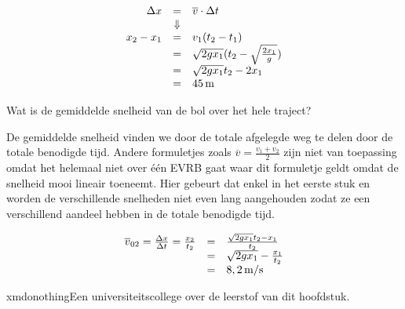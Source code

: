 \documentclass{ximera}
\begin{document}
\begin{exercise}
\begin{question}
\begin{oplossing}
	\[
	\begin{array}{rcl}
	\Delta x&=&\overline{v}\cdot\Delta t\\
	&\Downarrow&\\
	x_2-x_1&=&v_1(t_2-t_1)\\
	&=&\sqrt{2gx_1}(t_2-\sqrt{\frac{2x_1}{g}})\\
	&=&\sqrt{2gx_1}t_2-2x_1\\
	&=&45\rm\,m
	\end{array}
	\]

\end{oplossing}
\end{question}
\begin{question} Wat is de gemiddelde snelheid van de bol over het hele traject? \end{question}

\begin{oplossing}


De gemiddelde snelheid vinden we door de totale afgelegde weg te delen door de totale benodigde tijd. Andere formuletjes zoals $\overline{v}=\frac{v_1+v_2}{2}$ zijn niet van toepassing omdat het helemaal niet over \'e\'en EVRB gaat waar dit formuletje geldt omdat de snelheid mooi lineair toeneemt. Hier gebeurt dat enkel in het eerste stuk en worden de verschillende snelheden niet even lang aangehouden zodat ze een verschillend aandeel hebben in de totale benodigde tijd.

\[
\begin{array}{rcl}
\overline{v}_{02}=\frac{\Delta x}{\Delta t}=\frac{x_2}{t_2}&=&\frac{\sqrt{2gx_1}t_2-x_1}{t_2}\\
&=&\sqrt{2gx_1}-\frac{x_1}{t_2}\\
&=&8,2\rm\,m/s
\end{array}
\]

\end{oplossing}
\end{exercise}

\begin{expandable}{xmdonothing}{Een universiteitscollege over de leerstof van dit hoofdstuk.}
\end{expandable}
\end{document}
